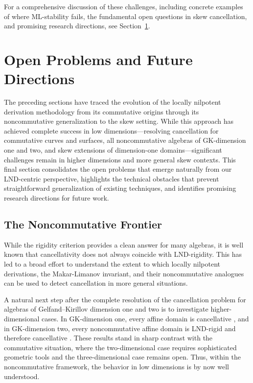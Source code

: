 \documentclass{amsart}
\theoremstyle{plain}
\numberwithin{theorem}{section}
\numberwithin{equation}{theorem}
\theoremstyle{definition}
\begin{document}
For a comprehensive discussion of these challenges, including concrete 
examples of where ML-stability fails, the fundamental open questions in 
skew cancellation, and promising research directions, see Section~\ref{xxsec5}.






\section{Open Problems and Future Directions}
\label{xxsec5}

The preceding sections have traced the evolution of the locally nilpotent derivation methodology from its commutative origins through its noncommutative generalization to the skew setting. While this approach has achieved complete success in low dimensions—resolving cancellation for commutative curves and surfaces, all noncommutative algebras of GK-dimension one and two, and skew extensions of dimension-one domains—significant challenges remain in higher dimensions and more general skew contexts. This final section consolidates the open problems that emerge naturally from our LND-centric perspective, highlights the technical obstacles that prevent straightforward generalization of existing techniques, and identifies promising research directions for future work.

\subsection{The Noncommutative Frontier}

While the rigidity criterion provides a clean answer for many algebras, it is well known that cancellativity does not always coincide with LND-rigidity. This has led to a broad effort to understand the extent to which locally nilpotent derivations, the Makar-Limanov invariant, and their noncommutative analogues can be used to detect cancellation in more general situations.

A natural next step after the complete resolution of the cancellation problem for algebras of Gelfand--Kirillov dimension one and two is to investigate higher-dimensional cases. In GK-dimension one, every affine domain is cancellative \cite{BHHV}, and in GK-dimension two, every noncommutative affine domain is LND-rigid and therefore cancellative \cite{BellZhang2017}. These results stand in sharp contrast with the commutative situation, where the two-dimensional case requires sophisticated geometric tools \cite{ Fu,MS} and the three-dimensional case remains open. Thus, within the noncommutative framework, the behavior in low dimensions is by now well understood.
\end{document}
